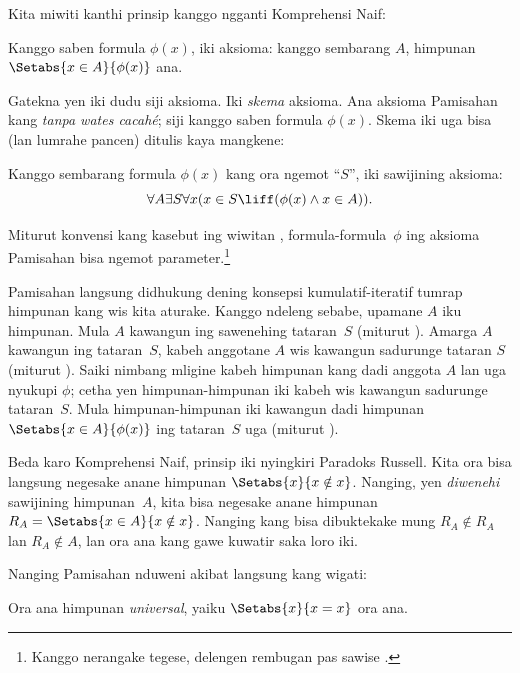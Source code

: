 \documentclass[../../../include/open-logic-section]{subfiles}
\begin{document}

Kita miwiti kanthi prinsip kanggo ngganti Komprehensi Naif:

\begin{axiom} Kanggo saben formula $\phi(x)$, iki
aksioma: kanggo sembarang $A$, himpunan $\Setabs{x \in A}{\phi(x)}$ ana.
\end{axiom}

Gatekna yen iki dudu siji aksioma. Iki \emph{skema} aksioma.
Ana aksioma Pamisahan kang \emph{tanpa wates cacahé}; siji
kanggo saben formula $\phi(x)$. Skema iki uga bisa
(lan lumrahe pancen) ditulis kaya mangkene:

\begin{defish}
Kanggo sembarang formula $\phi(x)$ kang ora ngemot ``$S$'',
iki sawijining aksioma:
\[
	\forall A \exists S \forall x(x \in S \liff (\phi(x) \land x \in A)).
\]
\end{defish}

Miturut konvensi kang kasebut ing wiwitan
, formula-formula~$\phi$ ing aksioma
Pamisahan bisa ngemot parameter.\footnote{Kanggo nerangake
tegese, delengen rembugan pas sawise
.}

Pamisahan langsung didhukung dening konsepsi
kumulatif-iteratif tumrap himpunan kang wis kita aturake.
Kanggo ndeleng sebabe, upamane $A$ iku himpunan.
Mula $A$ kawangun ing sawenehing tataran~$S$
(miturut \stageshier). Amarga $A$ kawangun ing tataran~$S$,
kabeh anggotane $A$ wis kawangun sadurunge tataran $S$
(miturut \stagesacc). Saiki nimbang mligine kabeh himpunan
kang dadi anggota $A$ lan uga nyukupi $\phi$; cetha yen
himpunan-himpunan iki kabeh wis kawangun sadurunge
tataran~$S$. Mula himpunan-himpunan iki kawangun dadi
himpunan $\Setabs{x \in A}{\phi(x)}$ ing tataran~$S$
uga (miturut \stagesacc).

Beda karo Komprehensi Naif, prinsip iki nyingkiri Paradoks
Russell. Kita ora bisa langsung negesake anane himpunan
$\Setabs{x}{x \notin x}$. Nanging, yen \emph{diwenehi}
sawijining himpunan~$A$, kita bisa negesake anane himpunan
$R_A = \Setabs{x \in A}{x \notin x}$. Nanging kang bisa
dibuktekake mung $R_A \notin R_A$ lan $R_A \notin A$,
lan ora ana kang gawe kuwatir saka loro iki.

Nanging Pamisahan nduweni akibat langsung kang wigati:

\begin{thm}
Ora ana himpunan \emph{universal}, yaiku
$\Setabs{x}{x = x}$ ora ana.
\end{thm}
\end{document}
